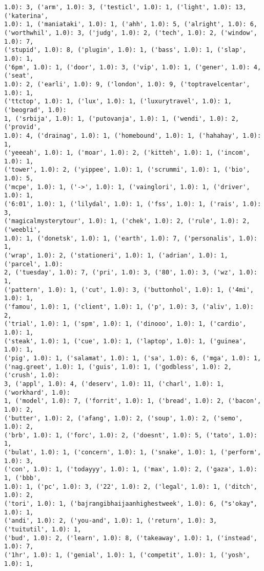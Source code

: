 \documentclass[11pt]{article}
\begin{document}
\begin{Verbatim}[commandchars=\\\{\}]
1.0): 3, ('arm', 1.0): 3, ('testicl', 1.0): 1, ('light', 1.0): 13, ('katerina',
1.0): 1, ('maniataki', 1.0): 1, ('ahh', 1.0): 5, ('alright', 1.0): 6,
('worthwhil', 1.0): 3, ('judg', 1.0): 2, ('tech', 1.0): 2, ('window', 1.0): 7,
('stupid', 1.0): 8, ('plugin', 1.0): 1, ('bass', 1.0): 1, ('slap', 1.0): 1,
('6pm', 1.0): 1, ('door', 1.0): 3, ('vip', 1.0): 1, ('gener', 1.0): 4, ('seat',
1.0): 2, ('earli', 1.0): 9, ('london', 1.0): 9, ('toptravelcentar', 1.0): 1,
('ttctop', 1.0): 1, ('lux', 1.0): 1, ('luxurytravel', 1.0): 1, ('beograd', 1.0):
1, ('srbija', 1.0): 1, ('putovanja', 1.0): 1, ('wendi', 1.0): 2, ('provid',
1.0): 4, ('drainag', 1.0): 1, ('homebound', 1.0): 1, ('hahahay', 1.0): 1,
('yeeeah', 1.0): 1, ('moar', 1.0): 2, ('kitteh', 1.0): 1, ('incom', 1.0): 1,
('tower', 1.0): 2, ('yippee', 1.0): 1, ('scrummi', 1.0): 1, ('bio', 1.0): 5,
('mcpe', 1.0): 1, ('->', 1.0): 1, ('vainglori', 1.0): 1, ('driver', 1.0): 1,
('6:01', 1.0): 1, ('lilydal', 1.0): 1, ('fss', 1.0): 1, ('rais', 1.0): 3,
('magicalmysterytour', 1.0): 1, ('chek', 1.0): 2, ('rule', 1.0): 2, ('weebli',
1.0): 1, ('donetsk', 1.0): 1, ('earth', 1.0): 7, ('personalis', 1.0): 1,
('wrap', 1.0): 2, ('stationeri', 1.0): 1, ('adrian', 1.0): 1, ('parcel', 1.0):
2, ('tuesday', 1.0): 7, ('pri', 1.0): 3, ('80', 1.0): 3, ('wz', 1.0): 1,
('pattern', 1.0): 1, ('cut', 1.0): 3, ('buttonhol', 1.0): 1, ('4mi', 1.0): 1,
('famou', 1.0): 1, ('client', 1.0): 1, ('p', 1.0): 3, ('aliv', 1.0): 2,
('trial', 1.0): 1, ('spm', 1.0): 1, ('dinooo', 1.0): 1, ('cardio', 1.0): 1,
('steak', 1.0): 1, ('cue', 1.0): 1, ('laptop', 1.0): 1, ('guinea', 1.0): 1,
('pig', 1.0): 1, ('salamat', 1.0): 1, ('sa', 1.0): 6, ('mga', 1.0): 1,
('nag.greet', 1.0): 1, ('guis', 1.0): 1, ('godbless', 1.0): 2, ('crush', 1.0):
3, ('appl', 1.0): 4, ('deserv', 1.0): 11, ('charl', 1.0): 1, ('workhard', 1.0):
1, ('model', 1.0): 7, ('forrit', 1.0): 1, ('bread', 1.0): 2, ('bacon', 1.0): 2,
('butter', 1.0): 2, ('afang', 1.0): 2, ('soup', 1.0): 2, ('semo', 1.0): 2,
('brb', 1.0): 1, ('forc', 1.0): 2, ('doesnt', 1.0): 5, ('tato', 1.0): 1,
('bulat', 1.0): 1, ('concern', 1.0): 1, ('snake', 1.0): 1, ('perform', 1.0): 3,
('con', 1.0): 1, ('todayyy', 1.0): 1, ('max', 1.0): 2, ('gaza', 1.0): 1, ('bbb',
1.0): 1, ('pc', 1.0): 3, ('22', 1.0): 2, ('legal', 1.0): 1, ('ditch', 1.0): 2,
('tori', 1.0): 1, ('bajrangibhaijaanhighestweek', 1.0): 6, ("s'okay", 1.0): 1,
('andi', 1.0): 2, ('you-and', 1.0): 1, ('return', 1.0): 3, ('tuitutil', 1.0): 1,
('bud', 1.0): 2, ('learn', 1.0): 8, ('takeaway', 1.0): 1, ('instead', 1.0): 7,
('1hr', 1.0): 1, ('genial', 1.0): 1, ('competit', 1.0): 1, ('yosh', 1.0): 1,

\end{Verbatim}
\end{document}
